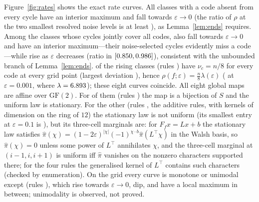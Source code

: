 \documentclass[11pt,a4paper]{article}
\theoremstyle{remark}
\newcommand{\eps}{\varepsilon}
\begin{document}
Figure~\ref{fig:rates} shows the exact rate curves. All \NumClassesBproved{} classes with a code absent from every cycle have an interior maximum and fall towards $\eps\to0$ (the ratio of $\rho$ at the two smallest resolved noise levels is at least \FallingBTrendMin), as Lemma~\ref{lem:ends} requires. Among the \NumClassesUndet{} classes whose cycles jointly cover all codes, \NumFallingU{} also fall towards $\eps\to0$ and have an interior maximum---their noise-selected cycles evidently miss a code---while \NumRisingU{} rise as $\eps$ decreases (ratio in $[0.850,0.986]$), consistent with the unbounded branch of Lemma~\ref{lem:ends}. \NumUniformMarginal{} of the rising classes (rules \UniformMarginalRules) have $\nu_c=n/8$ for every code at every grid point (largest deviation \UniformMarginalMaxDev), hence $\rho(f;\eps)=\tfrac n8\lambda(\eps)$ (\UniformMarginalRhoSmall{} at $\eps=0.001$, where $\lambda=6.893$); these eight curves coincide. All eight global maps are affine over $\mathrm{GF}(2)$. For \NumBijective{} of them (rules \BijectiveRules) the map is a bijection of $S$ and the uniform law is stationary. For the other \NumAffineNonBij{} (rules \AffineNonBijRules, the additive rules, with kernels of dimension \AffineKernelDims{} on the ring of $12$) the stationary law is not uniform (its smallest entry at $\eps=0.1$ is \AffineMinPi), but its three-cell marginals are: for $F_fx=Lx+b$ the stationary law satisfies $\hat\pi(\chi)=(1-2\eps)^{|\chi|}(-1)^{\chi\cdot b}\hat\pi(L^{\!\top}\chi)$ in the Walsh basis, so $\hat\pi(\chi)=0$ unless some power of $L^{\!\top}$ annihilates $\chi$, and the three-cell marginal at $(i-1,i,i+1)$ is uniform iff $\hat\pi$ vanishes on the nonzero characters supported there; for the four rules the generalised kernel of $L^{\!\top}$ contains \AffineBadCharacters{} such characters (checked by enumeration). On the grid every curve is monotone or unimodal except \NumSignChangesGtOne{} (rules \SignChangesGtOneRules), which rise towards $\eps\to0$, dip, and have a local maximum in between; unimodality is observed, not proved.
\end{document}

